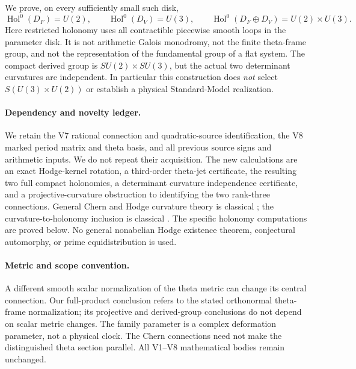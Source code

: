 \documentclass[11pt]{article}
\theoremstyle{definition}
\theoremstyle{remark}
\begin{document}
We prove, on every sufficiently small such disk,
\begin{equation}
 \boxed{\operatorname{Hol}^0(D_F)=U(2),\qquad
        \operatorname{Hol}^0(D_V)=U(3),\qquad
        \operatorname{Hol}^0(D_F\oplus D_V)=U(2)\times U(3).}
 \label{eq:v9-headline}
\end{equation}
Here restricted holonomy uses all contractible piecewise smooth loops in
the parameter disk. It is not arithmetic Galois monodromy, not the finite
theta-frame group, and not the representation of the fundamental group of
a flat system. The compact derived group is $SU(2)\times SU(3)$, but the
actual two determinant curvatures are independent. In particular this
construction does \emph{not} select $S(U(3)\times U(2))$ or establish a
physical Standard-Model realization.

\paragraph{Dependency and novelty ledger.}
We retain the V7 rational connection and quadratic-source identification,
the V8 marked period matrix and theta basis, and all previous source signs
and arithmetic inputs. We do not repeat their acquisition. The new
calculations are an exact Hodge-kernel rotation, a third-order theta-jet
certificate, the resulting two full compact holonomies, a determinant
curvature independence certificate, and a projective-curvature obstruction
to identifying the two rank-three connections. General Chern and Hodge
curvature theory is classical \cite{GreenGriffiths,SimpsonHiggs}; the
curvature-to-holonomy inclusion is classical \cite{AmbroseSinger}. The
specific holonomy computations are proved below. No general nonabelian
Hodge existence theorem, conjectural automorphy, or prime equidistribution
is used.

\paragraph{Metric and scope convention.}
A different smooth scalar normalization of the theta metric can change its
central connection. Our full-product conclusion refers to the stated
orthonormal theta-frame normalization; its projective and derived-group
conclusions do not depend on scalar metric changes. The family parameter
is a complex deformation parameter, not a physical clock. The Chern
connections need not make the distinguished theta section parallel.
All V1--V8 mathematical bodies remain unchanged.
\end{document}
